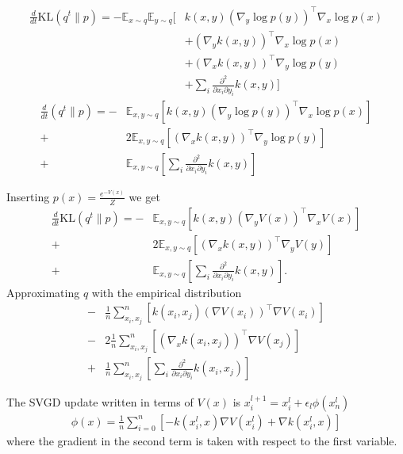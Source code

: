 \documentclass{article}
\begin{document}
\begin{align}
    \frac{d}{dt} \text{KL}( q^t \| p ) = - \mathbb{E}_{x\sim q} \mathbb{E}_{y \sim q} \big[
        & k(x,y) (\nabla_y \log p(y))^\top \nabla_x \log p(x) \\
        &+ (\nabla_y k(x,y) )^\top \nabla_x \log p(x) \\
        &+ (\nabla_x k(x,y) )^\top \nabla_y \log p(y) \\
        &+ \sum_i \frac{ \partial^2 }{ \partial x_i \partial y_i } k(x,y) \big]
\end{align}
\begin{align}
    \frac{d}{dt}    ( q^t \| p ) =
    -& \mathbb{E}_{x,y\sim q} \left[ k(x,y) (\nabla_y \log p(y))^\top \nabla_x \log p(x) \right] \\ 
    +& 2 \mathbb{E}_{x,y\sim q} \left[ (\nabla_x k(x,y) )^\top \nabla_y \log p(y) \right] \\ 
    +& \mathbb{E}_{x,y\sim q} \left[ \sum_i \frac{ \partial^2 }{ \partial x_i \partial y_i } k(x,y) \right]
\end{align}

Inserting $p(x) = \frac{e^{-V(x)}}{Z}$ we get
\begin{align}
    \frac{d}{dt} \text{KL}( q^t \| p ) =
    -& \mathbb{E}_{x,y\sim q} \left[ k(x,y) (\nabla_y V(x))^\top \nabla_x V(x) \right] \\ 
    +& 2 \mathbb{E}_{x,y\sim q} \left[ (\nabla_x k(x,y) )^\top \nabla_y V(y) \right] \\ 
    +& \mathbb{E}_{x,y\sim q} \left[ \sum_i \frac{ \partial^2 }{ \partial x_i \partial y_i } k(x,y) \right]
    .
\end{align}
Approximating $q$ with the empirical distribution
\begin{align}
    -& \frac{1}{n}\sum_{x_i,x_j}^n \left[ k(x_i,x_j) (\nabla V(x_i))^\top \nabla V(x_i) \right] \\ 
    -& 2 \frac{1}{n}\sum_{x_i,x_j}^n \left[ (\nabla_x k(x_i,x_j) )^\top \nabla V(x_j) \right] \\ 
    +& \frac{1}{n}\sum_{x_i,x_j}^n \left[ \sum_i \frac{ \partial^2 }{ \partial x_i \partial y_i } 
        k(x_i,x_j) \right]
\end{align}

The SVGD update written in terms of $V(x)$ is $x_i^{l+1} = x_i^l + \epsilon_l \phi(x_n^l)$
\begin{align}
    \phi(x) = \frac{1}{n} \sum_{i=0}^{n} \left[
        - k(x_i^l, x) \nabla V(x_i^l) + \nabla k(x_i^l, x)
    \right]
\end{align}
where the gradient in the second term is taken with respect to the first variable.
\end{document}
